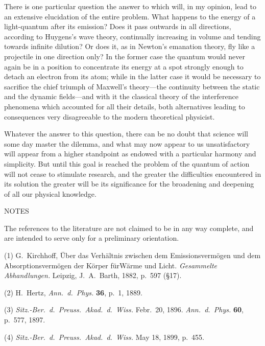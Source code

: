 \documentclass[12pt,oneside]{book}
\begin{document}
There is one particular question the answer to which
will, in my opinion, lead to an extensive elucidation of the
entire problem. What happens to the energy of a light-quantum
after its emission? Does it pass outwards in all
directions, according to Huygens's wave theory, continually
increasing in volume and tending towards infinite dilution?
Or does it, as in Newton's emanation theory, fly like a projectile
in one direction only? In the former case the
quantum would never again be in a position to concentrate
its energy at a spot strongly enough to detach an electron
from its atom; while in the latter case it would be necessary
to sacrifice the chief triumph of Maxwell's theory---the
continuity between the static and the dynamic fields---and
with it the classical theory of the interference phenomena
which accounted for all their details, both alternatives
leading to consequences very disagreeable to the modern
theoretical physicist.

Whatever the answer to this question, there can be no
doubt that science will some day master the dilemma, and
what may now appear to us unsatisfactory will appear from
a higher standpoint as endowed with a particular harmony
and simplicity. But until this goal is reached the problem
of the quantum of action will not cease to stimulate
research, and the greater the difficulties encountered in
its solution the greater will be its significance for the
broadening and deepening of all our physical knowledge.

\clearpage

\begin{center}\Large{NOTES}\end{center}

The references to the literature are not claimed to be in any way
complete, and are intended to serve only for a preliminary orientation.

(1) G.~Kirchhoff, \"{U}ber das Verh\"{a}ltnis zwischen dem Emissionsverm\"{o}gen und dem Absorptionsverm\"{o}gen
der K\"{o}rper f\"{u}r\hspace{4pt}W\"{a}rme und Licht.
\textit{Gesammelte Abhandlungen.} Leipzig, J.~A.~Barth, 1882, p.~597 (\S 17).

(2) H.~Hertz, \textit{Ann.\ d.\ Phys.} \textbf{36}, p.~1, 1889.

(3) \textit{Sitz.-Ber.\ d.\ Preuss.\ Akad.\ d.\ Wiss.} Febr.\ 20, 1896. \textit{Ann.\ d.\ Phys.} \textbf{60}, p.\ 577, 1897.

(4) \textit{Sitz.-Ber.\ d.\ Preuss.\ Akad.\ d.\ Wiss.} May 18, 1899, p.\ 455.
\end{document}
